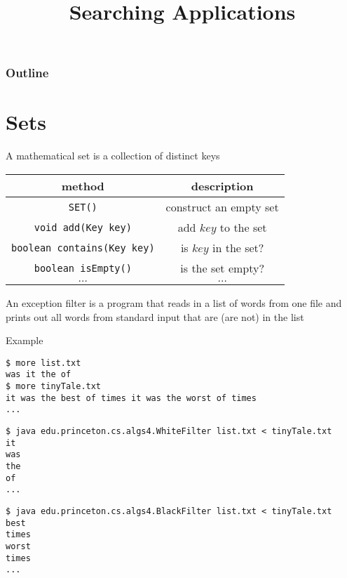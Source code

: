 \documentclass[8pt,a4paper,compress]{beamer}
\title{Searching Applications}
\date{}
\begin{document}
\begin{frame}
\vfill
\titlepage
\end{frame}

\begin{frame}
\frametitle{Outline}
\tableofcontents
\end{frame}

\section{Sets}
\begin{frame}[fragile]
\pause

A mathematical set is a collection of distinct keys
\begin{center}
\begin{tabular}{cc}
method & description \\ \hline
\lstinline$SET()$ & construct an empty set \\
\lstinline$void add(Key key)$ & add $key$ to the set \\
\lstinline$boolean contains(Key key)$ & is $key$ in the set? \\
\lstinline$boolean isEmpty()$ & is the set empty? \\
$\dots$ & $\dots$
\end{tabular}
\end{center}

\pause
\bigskip

An exception filter is a program that reads in a list of words from one file and prints out all words from standard input that are (are not) in the list

\pause
\bigskip

Example
\begin{lstlisting}[language={}]
$ more list.txt
was it the of
$ more tinyTale.txt
it was the best of times it was the worst of times
...
\end{lstlisting}

\begin{lstlisting}[language={}]
$ java edu.princeton.cs.algs4.WhiteFilter list.txt < tinyTale.txt 
it 
was 
the 
of 
...
\end{lstlisting}

\begin{lstlisting}[language={}]
$ java edu.princeton.cs.algs4.BlackFilter list.txt < tinyTale.txt
best 
times 
worst 
times
...
\end{lstlisting}
\end{frame}
\end{document}

